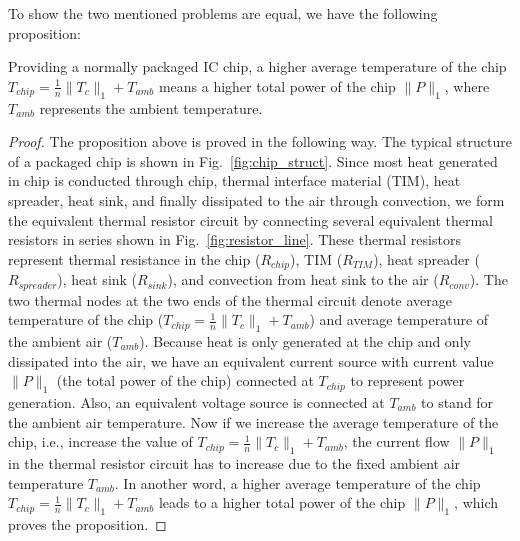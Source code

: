 To show the two mentioned problems are equal, we have the following
proposition: 
\begin{proposition}
Providing a normally packaged IC chip, a higher average temperature of
the chip $T_{chip} = \frac{1}{n}\|T_c\|_1 + T_{amb}$ means a higher total power of the
chip $\|P\|_1$, where $T_{amb}$ represents the ambient temperature.
\end{proposition}
\begin{proof}
The proposition above is proved in the following way. The typical structure
of a packaged chip is shown in Fig.~\ref{fig:chip_struct}. Since most heat generated in chip is
conducted through chip, thermal interface material (TIM), heat spreader,
heat sink, and finally dissipated to the air through convection, we
form the equivalent thermal resistor circuit by connecting several
equivalent thermal resistors in series shown in Fig.~\ref{fig:resistor_line}. These thermal resistors represent thermal
resistance in the chip ($R_{chip}$), TIM ($R_{TIM}$), heat spreader
($R_{spreader}$), heat sink ($R_{sink}$), and convection from heat
sink to the air ($R_{conv}$). The two thermal nodes at the two ends of
the thermal circuit denote average temperature of the chip
($T_{chip}=\frac{1}{n}\|T_c\|_1 + T_{amb}$) and average temperature of the
ambient air ($T_{amb}$). 
Because heat is only generated at the chip and only
dissipated into the air, we have an equivalent current source with
current value $\|P\|_1$ (the total power of the chip) connected
at $T_{chip}$ to represent power generation. Also, an equivalent voltage
source is connected at $T_{amb}$ to stand for the ambient air
temperature. Now if we increase the average temperature of the chip,
i.e., increase the value of $T_{chip}=\frac{1}{n}\|T_c\|_1+T_{amb}$, the current flow $\|P\|_1$ in the thermal
resistor circuit has to increase due to the fixed ambient air temperature
$T_{amb}$. In another word, a higher average temperature of
the chip $T_{chip} = \frac{1}{n}\|T_c\|_1 + T_{amb}$ leads to a higher total power of the
chip $\|P\|_1$, which proves the proposition.
\end{proof}

